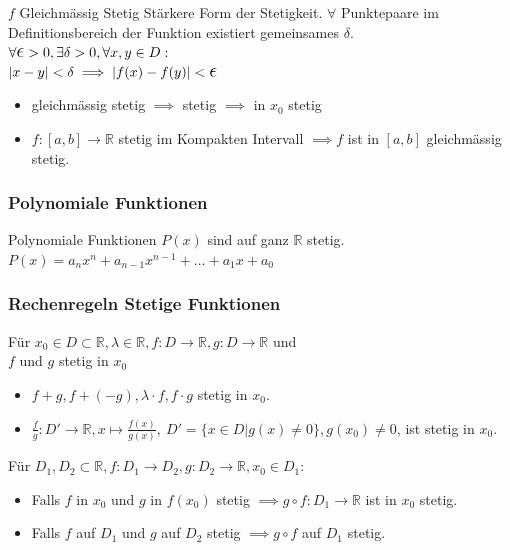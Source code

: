 \documentclass[a4paper]{article}
\let\oldepsilon\epsilon
\renewcommand{\epsilon}{\text{\Large $\oldepsilon$}}
\newcommand\R{\ensuremath{\mathbb{R}}}
\begin{document}
\begin{mainbox}{$f$ Gleichmässig Stetig}
  Stärkere Form der Stetigkeit. $\forall$ Punktepaare im Definitionsbereich der Funktion existiert gemeinsames $\delta$. \\ 
  $\forall \epsilon > 0, \exists \delta > 0, \forall x, y \in D:$ \\
  $|x-y| < \delta \implies |f(x)-f(y)| < \epsilon$
\end{mainbox}
\begin{itemize}[leftmargin=4.5mm, topsep=1pt, parsep=1pt]
  \item gleichmässig stetig $\implies$ stetig $\implies$ in $x_0$ stetig
  \item $f: [a, b] \to \R$ stetig im Kompakten Intervall $\implies f$ ist in $[a,b]$ gleichmässig stetig.
\end{itemize}

\subsubsection{Polynomiale Funktionen}
Polynomiale Funktionen $P(x)$ sind auf ganz $\R$ stetig. \\
$P(x) = a_n x^n + a_{n-1} x^{n-1} + \ldots + a_1 x + a_0$ \\

\subsubsection{Rechenregeln Stetige Funktionen}
  Für $x_0 \in D \subset \R, \lambda \in \R, f: D \to \R, g: D \to \R$ und \\
    $f$ und $g$ stetig in $x_0$
  \begin{itemize}[leftmargin=7mm, topsep=1pt, parsep=1pt] 
    \item[$\Rightarrow$] $f + g, f + (-g), \lambda \cdot f, f \cdot g$ stetig in $x_0$.
    \item[$\Rightarrow$] $\frac{f}{g}: D' \to \R, x \mapsto \frac{f(x)}{g(x)}, \ D' = \{x \in D | g(x) \neq 0\}, g(x_0) \neq 0$, ist stetig in $x_0$.
\end{itemize}

Für $D_1, D_2 \subset \R, f: D_1 \to D_2, g: D_2 \to \R, x_0 \in D_1$:
\begin{itemize}[leftmargin=4.5mm, topsep=1pt, parsep=1pt] 
    \item Falls $f$ in $x_0$ und $g$ in $f(x_0)$ stetig $\implies g \circ f : D_1 \to \R$ ist in $x_0$ stetig.
    \item Falls $f$ auf $D_1$ und $g$ auf $D_2$ stetig $\implies g \circ f$ auf $D_1$ stetig.
\end{itemize}
\end{document}
